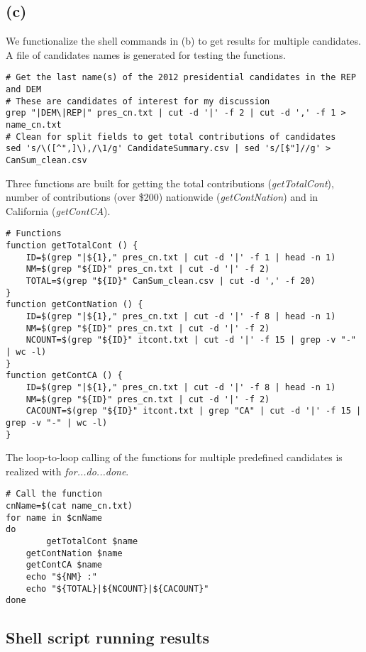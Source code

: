 \documentclass{article}
\begin{document}
\subsection*{(c)}

We functionalize the shell commands in (b) to get results for multiple candidates. A file of candidates names is generated for testing the functions.

\begin{lstlisting}
# Get the last name(s) of the 2012 presidential candidates in the REP and DEM
# These are candidates of interest for my discussion
grep "|DEM\|REP|" pres_cn.txt | cut -d '|' -f 2 | cut -d ',' -f 1 > name_cn.txt
# Clean for split fields to get total contributions of candidates
sed 's/\([^",]\),/\1/g' CandidateSummary.csv | sed 's/[$"]//g' > CanSum_clean.csv
\end{lstlisting}

Three functions are built for getting the total contributions (\textit{getTotalCont}), number of contributions 
(over \$200) nationwide (\textit{getContNation}) and in California (\textit{getContCA}).

\begin{lstlisting}
# Functions
function getTotalCont () {
    ID=$(grep "|${1}," pres_cn.txt | cut -d '|' -f 1 | head -n 1)
    NM=$(grep "${ID}" pres_cn.txt | cut -d '|' -f 2)
    TOTAL=$(grep "${ID}" CanSum_clean.csv | cut -d ',' -f 20)
}
function getContNation () {
    ID=$(grep "|${1}," pres_cn.txt | cut -d '|' -f 8 | head -n 1)
    NM=$(grep "${ID}" pres_cn.txt | cut -d '|' -f 2)
    NCOUNT=$(grep "${ID}" itcont.txt | cut -d '|' -f 15 | grep -v "-" | wc -l)
}
function getContCA () {
    ID=$(grep "|${1}," pres_cn.txt | cut -d '|' -f 8 | head -n 1)
    NM=$(grep "${ID}" pres_cn.txt | cut -d '|' -f 2)
    CACOUNT=$(grep "${ID}" itcont.txt | grep "CA" | cut -d '|' -f 15 | grep -v "-" | wc -l)
}
\end{lstlisting}

The loop-to-loop calling of the functions for multiple predefined candidates is realized with \textit{for...do...done}.

\begin{lstlisting}
# Call the function
cnName=$(cat name_cn.txt)
for name in $cnName
do
		getTotalCont $name
    getContNation $name
    getContCA $name
    echo "${NM} :"
    echo "${TOTAL}|${NCOUNT}|${CACOUNT}"
done
\end{lstlisting}

\subsection*{Shell script running results}
\end{document}
